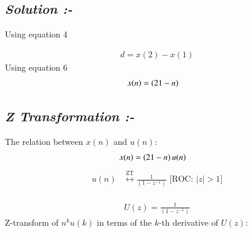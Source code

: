 \documentclass[journal,12pt,twocolumn]{IEEEtran}
\theoremstyle{remark}
\begin{document}
\subsection*{\textit{Solution :-}}
\begin{table}[h!]
   
        
       
    \end{table}
Using equation 4 


\begin{align}d=x(2)-x(1)\end{align}
Using equation 6
\begin{align}x(n) &= \left(21-n\right)\end{align}
\subsection*{\textit{Z Transformation :-}}
The relation between \(x(n)\) and \(u(n)\):
\begin{align}
 x(n) &= \left(21-n\right) u(n)\label{eq:1}
\end{align}
\begin{align}
   u(n) &\overset{\text{ZT}}{\longleftrightarrow} \frac{1}{(1 - z^{-1})}
    \text{ [ROC: } \lvert z \rvert > 1\text{]}\end{align} \\
  \begin{align}  U(z)=\frac{1}{(1 - z^{-1})}\end{align}
Z-transform of \(n^ku(k)\) in terms of the \(k\)-th derivative of \(U(z)\):
\end{document}
